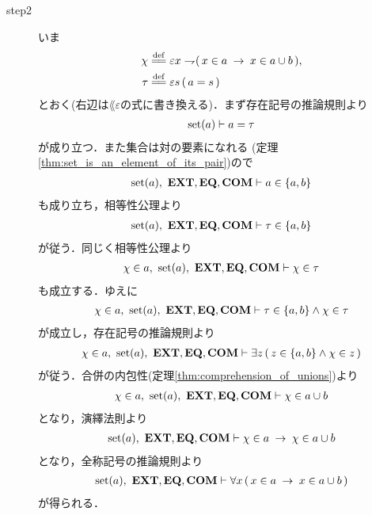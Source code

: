 \begin{sketch}
\begin{description}
			\item[step2]
				いま
				\begin{align}
					\chi &\defeq \varepsilon x \negation (\, x \in a \rarrow x \in a \cup b\, ), \\
					\tau &\defeq \varepsilon s\, (\, a = s\, )
				\end{align}
				とおく(右辺は$\lang{\varepsilon}$の式に書き換える)．まず存在記号の推論規則より
				\begin{align}
					\operatorname*{set} (a) \vdash a = \tau
				\end{align}
				が成り立つ．また集合は対の要素になれる
				(定理\ref{thm:set_is_an_element_of_its_pair})ので
				\begin{align}
					\operatorname*{set} (a),\ \mbox{{\bf EXT}},\mbox{{\bf EQ}},\mbox{\bf COM} \vdash a \in \{a,b\}
				\end{align}
				も成り立ち，相等性公理より
				\begin{align}
					\operatorname*{set} (a),\ \mbox{{\bf EXT}},\mbox{{\bf EQ}},\mbox{\bf COM} \vdash \tau \in \{a,b\}
				\end{align}
				が従う．同じく相等性公理より
				\begin{align}
					\chi \in a,\ \operatorname*{set} (a),\ \mbox{{\bf EXT}},\mbox{{\bf EQ}},\mbox{\bf COM} \vdash \chi \in \tau
				\end{align}
				も成立する．ゆえに
				\begin{align}
					\chi \in a,\ \operatorname*{set} (a),\ \mbox{{\bf EXT}},\mbox{{\bf EQ}},\mbox{\bf COM} \vdash 
					\tau \in \{a,b\} \wedge \chi \in \tau
				\end{align}
				が成立し，存在記号の推論規則より
				\begin{align}
					\chi \in a,\ \operatorname*{set} (a),\ \mbox{{\bf EXT}},\mbox{{\bf EQ}},\mbox{\bf COM} \vdash 
					\exists z\, (\, z \in \{a,b\} \wedge \chi \in z\, )
				\end{align}
				が従う．合併の内包性(定理\ref{thm:comprehension_of_unions})より
				\begin{align}
					\chi \in a,\ \operatorname*{set} (a),\ \mbox{{\bf EXT}},\mbox{{\bf EQ}},\mbox{\bf COM} \vdash 
					\chi \in a \cup b
				\end{align}
				となり，演繹法則より
				\begin{align}
					\operatorname*{set} (a),\ \mbox{{\bf EXT}},\mbox{{\bf EQ}},\mbox{\bf COM} \vdash 
					\chi \in a \hspace{0.25em}\rightarrow\hspace{0.25em} \chi \in a \cup b
				\end{align}
				となり，全称記号の推論規則より
				\begin{align}
					\operatorname*{set} (a),\ \mbox{{\bf EXT}},\mbox{{\bf EQ}},\mbox{\bf COM} \vdash 
					\forall x\, (\, x \in a \hspace{0.25em}\rightarrow\hspace{0.25em} x \in a \cup b\, )
				\end{align}
				が得られる．
				\QED
		\end{description}
	\end{sketch}
	
